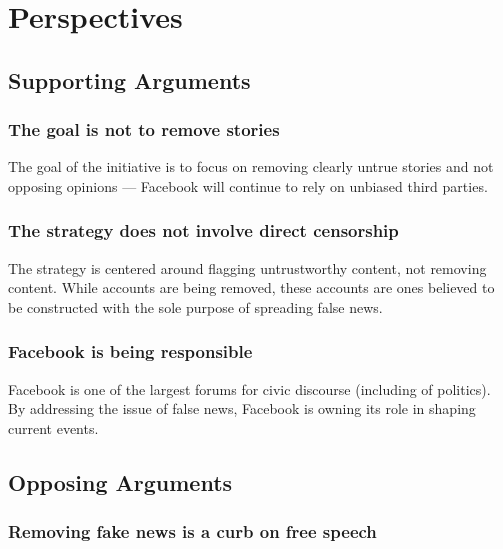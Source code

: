 
\section{Perspectives}

\subsection{Supporting Arguments}

\subsubsection{The goal is not to remove stories}

\par The goal of the initiative is to focus on removing clearly untrue stories and not opposing opinions --- Facebook will continue to rely on unbiased third parties. \cite{tc_downranks}

\subsubsection{The strategy does not involve direct censorship}

\par The strategy is centered around flagging untrustworthy content, not removing content. While accounts are being removed, these accounts are ones believed to be constructed with the sole purpose of spreading false news. \cite{tc_downranks}

\subsubsection{Facebook is being responsible}

\par Facebook is one of the largest forums for civic discourse (including of politics). By addressing the issue of false news, Facebook is owning its role in shaping current events. \cite{cnn_fight}

\subsection{Opposing Arguments}

\subsubsection{Removing fake news is a curb on free speech}

